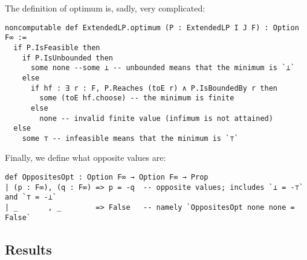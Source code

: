 \documentclass[]{article}
\renewcommand{\.}{\hskip .75pt}
\begin{document}
The definition of optimum is, sadly, very complicated:
\begin{lstlisting}
noncomputable def ExtendedLP.optimum (P : ExtendedLP I J F) : Option F∞ :=
  if P.IsFeasible then
    if P.IsUnbounded then
      some none --some ⊥ -- unbounded means that the minimum is `⊥`
    else
      if hf : ∃ r : F, P.Reaches (toE r) ∧ P.IsBoundedBy r then
        some (toE hf.choose) -- the minimum is finite
      else
        none -- invalid finite value (infimum is not attained)
  else
    some ⊤ -- infeasible means that the minimum is `⊤`
\end{lstlisting}
Finally, we define what opposite values are:
\begin{lstlisting}
def OppositesOpt : Option F∞ → Option F∞ → Prop
| (p : F∞), (q : F∞) => p = -q  -- opposite values; includes `⊥ = -⊤` and `⊤ = -⊥`
| _       , _        => False   -- namely `OppositesOpt none none = False`
\end{lstlisting}


\subsection{Results}
\end{document}
